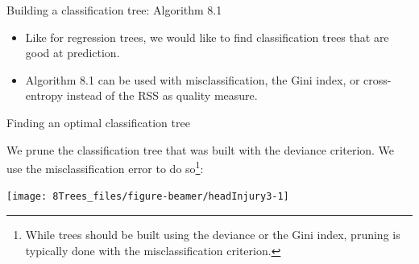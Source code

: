 \documentclass[10pt,ignorenonframetext,]{beamer}
\newenvironment{Shaded}{\begin{snugshade}}{\end{snugshade}}
\newcommand{\KeywordTok}[1]{\textcolor[rgb]{0.13,0.29,0.53}{\textbf{#1}}}
\newcommand{\DataTypeTok}[1]{\textcolor[rgb]{0.13,0.29,0.53}{#1}}
\newcommand{\DecValTok}[1]{\textcolor[rgb]{0.00,0.00,0.81}{#1}}
\newcommand{\StringTok}[1]{\textcolor[rgb]{0.31,0.60,0.02}{#1}}
\newcommand{\OperatorTok}[1]{\textcolor[rgb]{0.81,0.36,0.00}{\textbf{#1}}}
\newcommand{\NormalTok}[1]{#1}
\begin{document}
\begin{frame}

\begin{block}{Building a classification tree: Algorithm 8.1}

\vspace{2mm}

\begin{itemize}
\item
  Like for regression trees, we would like to find classification trees
  that are good at prediction.
\item
  Algorithm 8.1 can be used with misclassification, the Gini index, or
  cross-entropy instead of the RSS as quality measure.
\end{itemize}

\end{block}

\end{frame}

\begin{frame}[fragile]

\begin{block}{Finding an optimal classification tree}

\vspace{2mm}

We prune the classification tree that was built with the deviance
criterion. We use the misclassification error to do
so\footnote{While trees should be built using the deviance or the Gini index, pruning is typically done with the misclassification criterion.}:

\scriptsize

\begin{Shaded}
\end{Shaded}

\begin{center}\texttt{[image: 8Trees\_files/figure-beamer/headInjury3-1]} \end{center}

\end{block}

\end{frame}
\end{document}
